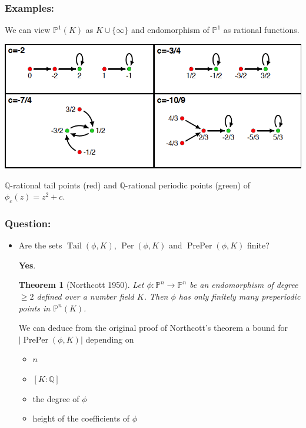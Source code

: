 \documentclass{beamer}
\def\PP{{\mathbb P}}
\def\QQ{{\mathbb Q}}
\DeclareMathOperator{\Tail}{Tail}
\DeclareMathOperator{\Per}{Per}
\DeclareMathOperator{\PrePer}{PrePer}
\theoremstyle{thmstyle}
\theoremstyle{thmstyle}
\newtheorem*{mythm}{Theorem}
\theoremstyle{mystyle}
\theoremstyle{qstnstyle}
\begin{document}
\begin{frame}
\frametitle{Examples:}
We can view $\PP^1(K)$ as $K\cup \{\infty \}$ and endomorphism of $\PP^1$ as rational functions.

\begin{center}
\includegraphics[width=1.0\linewidth]{placeholder4}
\end{center}

$\QQ$-rational tail points (red) and $\QQ$-rational periodic points (green) of  $\phi_c(z)=z^2+c$.
\end{frame}


\begin{frame}
\frametitle{Question:}
\begin{itemize}
\item Are the sets $\Tail(\phi,K)$, $\Per(\phi,K)$ and $\PrePer(\phi,K)$ finite? 

  \textbf{Yes}. 
\vspace{6mm} 

\begin{mythm}[Northcott 1950]
Let $\phi : \PP^n \to \PP^n$ be an endomorphism of degree $\geq{2}$
defined over a number field $K$. Then $\phi$ has
only finitely many preperiodic points in $\PP^n(K)$.
\end{mythm}

\vspace{6mm}  
We can deduce from the original proof of Northcott's theorem  a bound for $|\PrePer(\phi,K)|$ depending on
\begin{itemize}
\item $n$
\item $[K:\QQ]$
\item the degree of $\phi$
\item height of the coefficients of $\phi$
\end{itemize}

 
\end{itemize}
\end{frame}
\end{document}
